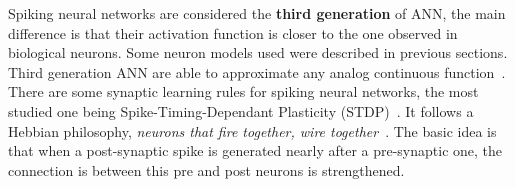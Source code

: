 Spiking neural networks are considered the \textbf{third generation} of ANN, the main difference is that their activation function is closer to the one observed in biological neurons. Some neuron models used were described in previous sections. Third generation ANN are able to approximate any analog continuous function~\cite{third-gen-nn-Maass1997}. 
There are some synaptic learning rules for spiking neural networks, the most studied one being Spike-Timing-Dependant Plasticity (STDP)~\cite{STDP-Song2000}. 
It follows a Hebbian philosophy, \emph{neurons that fire together, wire together}~\cite{hebb2005organization}. The basic idea is that when a post-synaptic spike is generated nearly after a pre-synaptic one, the connection is between this pre and post neurons is strengthened.\\

